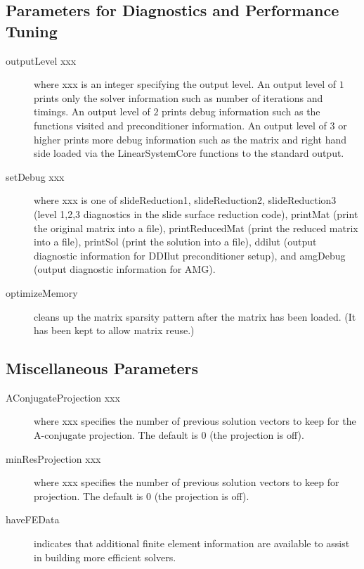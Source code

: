 \subsection{Parameters for Diagnostics and Performance Tuning}
\begin{description}
\item[outputLevel xxx] where xxx is an integer specifying the output
           level.  An output level of $1$ prints only the solver 
           information such as number of iterations and timings.
           An output level of $2$ prints debug information such as
           the functions visited and preconditioner information.
           An output level of $3$ or higher prints more debug information 
           such as the matrix and right hand side loaded via the 
           LinearSystemCore functions to the standard output.
\item[setDebug xxx] where xxx is one of {\sf slideReduction1}, 
           {\sf slideReduction2},
           {\sf slideReduction3} (level 1,2,3 diagnostics in the slide surface
           reduction code), {\sf printMat} (print the original matrix
           into a file), {\sf printReducedMat} (print the reduced matrix
           into a file),  {\sf printSol} (print the solution into a file), 
           {\sf ddilut} (output diagnostic information for DDIlut
           preconditioner setup), and {\sf amgDebug} (output diagnostic 
           information for AMG).
\item[optimizeMemory] cleans up the matrix sparsity pattern after the matrix
           has been loaded. (It has been kept to allow matrix reuse.)
\end{description}

\subsection{Miscellaneous Parameters}
\begin{description}
\item[AConjugateProjection xxx] where xxx specifies the number of previous
           solution vectors to keep for the A-conjugate projection. 
           The default is 0 (the projection is off).
\item[minResProjection xxx] where xxx specifies the number of previous
           solution vectors to keep for projection. 
           The default is 0 (the projection is off).
\item[haveFEData] indicates that additional finite element information are 
           available to assist in building more efficient solvers. 
\end{description}

